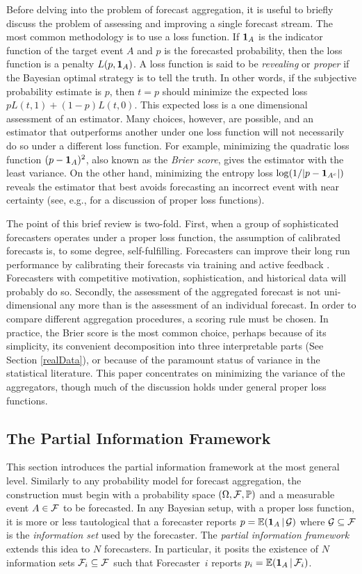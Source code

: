 \documentclass[11pt]{article}
\renewcommand{\P}{\mathbb{P}}
\newcommand{\E}{\mathbb{E}}
\theoremstyle{definition}
\theoremstyle{definition}
\def\one{{\bf 1}}
\def\F{{\cal F}}
\def\G{{\cal G}}
\def\P{{\mathbb P}}
\def\E{{\mathbb E}}
\def\|{\, | \,}
\begin{document}
Before delving into the problem of forecast aggregation, it is useful
to briefly discuss the problem of assessing and improving a single
forecast stream.  The most common methodology is to use a loss
function. If $\one_A$ is the indicator function of the target event
$A$ and $p$ is the forecasted probability, then the loss function is a penalty $L(p , \one_A)$.  A loss function is said to
be {\em revealing} or {\em proper} if the Bayesian optimal strategy is
to tell the truth.  In other words, if the subjective probability
estimate is $p$, then $t = p$ should minimize the expected loss $p
L(t,1) + (1-p) L(t,0)$.  This expected loss is a one dimensional
assessment of an estimator. Many choices, however, are possible, and
an estimator that outperforms another under one loss function will not
necessarily do so under a different loss function.  For example,
minimizing the quadratic loss function $(p - \one_A)^2$, also known as
the {\em Brier score}, gives the estimator with the least variance. On
the other hand, minimizing the entropy loss $\log (1 / |p -
\one_{A^c}|)$ reveals the estimator that best avoids forecasting an
incorrect event with near certainty (see, e.g., \citealt[Section~2]{HwPe1997}
for a discussion of proper loss functions).

The point of this brief review is two-fold.  First, when a group of
sophisticated forecasters operates under a proper loss function,
the assumption of calibrated forecasts is, to some degree,
self-fulfilling.  Forecasters can improve their long run performance
by calibrating their forecasts via training and active
feedback \citep{o2006uncertain}. Forecasters with competitive
motivation, sophistication, and historical data will probably do so. Secondly, the
assessment of the aggregated forecast is not uni-dimensional any more
than is the assessment of an individual forecast.  In order to compare
different aggregation procedures, a scoring rule must be chosen.  In
practice, the Brier score is the most common choice, perhaps because
of its simplicity, its convenient decomposition into three
interpretable parts (See Section \ref{realData}), or because of the
paramount status of variance in the statistical literature. This paper concentrates on minimizing the variance of the aggregators, though
 much of the discussion holds under general proper loss
functions.

\subsection{The Partial Information Framework}
\label{PIFintro}
This section introduces the partial information framework at the most general level. Similarly to any probability model for forecast aggregation, the construction must begin with
 a probability space $(\Omega, \F , \P)$ and a
measurable event $A \in \F$ to be forecasted.  In any Bayesian setup,
with a proper loss function, it is more or less tautological that a
forecaster reports $p = \E (\one_A \| \G)$ where $\G \subseteq \F$ is
the \textit{information set} used by the forecaster.  The
\textit{partial information framework} extends this idea to $N$
forecasters. In particular, it posits the existence of $N$
information sets $\F_i \subseteq \F$ such that Forecaster~$i$
reports $p_i = \E (\one_A \| \F_i)$.
\end{document}
